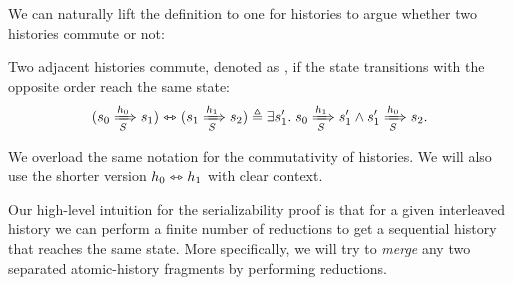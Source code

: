 We can naturally lift the definition to one for histories to argue whether two histories commute or not:
\begin{definition}
  \label{def-comm-hsts}
  Two adjacent histories commute, denoted as , if the state transitions with the opposite order reach the same state:
  \begin{displaymath}
    \commhst{(\semsteps{S}{s_0}{h_0}{s_1})}{(\semsteps{S}{s_1}{h_1}{s_2})} \triangleq \exists s_1'.\; \semsteps{S}{s_0}{h_1}{s_1'} \wedge \semsteps{S}{s_1'}{h_0}{s_2}.
  \end{displaymath}
\end{definition}
We overload the same notation for the commutativity of histories.
We will also use the shorter version $\commhst{h_0}{h_1}$ with clear context.

Our high-level intuition for the serializability proof is that for a given interleaved history we can perform a finite number of reductions to get a sequential history that reaches the same state.
More specifically, we will try to \emph{merge} any two separated atomic-history fragments by performing reductions.

